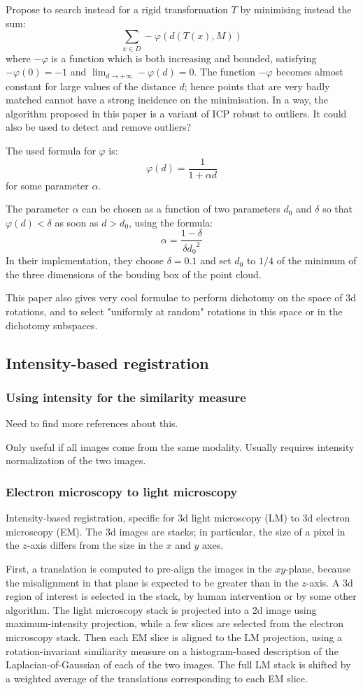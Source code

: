 \documentclass[11pt]{article} %
\begin{document}
Propose to search instead for a rigid transformation $T$ by minimising instead the sum: $$\sum_{x \in D}-\varphi(d(T(x), M))$$
where $-\varphi$ %
is a function which is both increasing and bounded, satisfying $-\varphi(0) = -1$ and $\lim_{d \rightarrow +\infty} -\varphi(d) = 0$. The function $-\varphi$ becomes almost constant for large values of the distance $d$; hence points that are very badly matched cannot have a strong incidence on the minimisation. In a way, the algorithm proposed in this paper is a variant of ICP robust to outliers. It could also be used to detect and remove outliers?

The used formula for $\varphi$ is:
$$\varphi(d) = \frac{1}{1+\alpha d}$$
for some parameter $\alpha$.

The parameter $\alpha$ can be chosen as a function of two parameters $d_0$ and $\delta$ so that $\varphi(d) < \delta$ as soon as $d > d_0$, using the formula:
$$\alpha = \frac{1-\delta}{\delta {d_0}^2}$$
In their implementation, they choose $\delta = 0.1$ and set $d_0$ to $1/4$ of the minimum of the three dimensions of the bouding box of the point cloud.

This paper also gives very cool formulae to perform dichotomy on the space of 3d rotations, and to select "uniformly at random" rotations in this space or in the dichotomy subspaces.

  \subsection{Intensity-based registration}
    \subsubsection{Using intensity for the similarity measure}
Need to find more references about this.

Only useful if all images come from the same modality. Usually requires intensity normalization of the two images.
    \subsubsection{Electron microscopy to light microscopy \cite{acosta:intensity}}
Intensity-based registration, specific for 3d light microscopy (LM) to 3d electron microscopy (EM). The 3d images are stacks; in particular, the size of a pixel in the $z$-axis differs from the size in the $x$ and $y$ axes.

First, a translation is computed to pre-align the images in the $xy$-plane, because the misalignment in that plane is expected to be greater than in the $z$-axis. A 3d region of interest is selected in the stack, by human intervention or by some other algorithm. The light microscopy stack is projected into a 2d image using maximum-intensity projection, while a few slices are selected from the electron microscopy stack. Then each EM slice is aligned to the LM projection, using a rotation-invariant similiarity measure on a histogram-based description of the Laplacian-of-Gaussian of each of the two images. The full LM stack is shifted by a weighted average of the translations corresponding to each EM slice.
\end{document}
